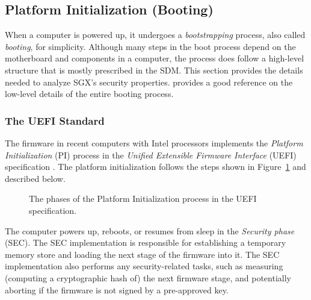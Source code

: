 \subsection{Platform Initialization (Booting)}
\label{sec:booting}

When a computer is powered up, it undergoes a \textit{bootstrapping} process,
also called \textit{booting}, for simplicity. Although many steps in the boot
process depend on the motherboard and components in a computer, the process
does follow a high-level structure that is mostly prescribed in the SDM. This
section provides the details needed to analyze SGX's security properties.
\cite{intel2010booting} provides a good reference on the low-level details of
the entire booting process.

\subsubsection{The UEFI Standard}
\label{sec:efi}

The firmware in recent computers with Intel processors implements the
\textit{Platform Initialization} (PI) process in the \textit{Unified
Extensible Firmware Interface} (UEFI) specification \cite{forum2015uefi}. The
platform initialization follows the steps shown in Figure~\ref{fig:uefi} and
described below.

\begin{figure}[hbt]
  \caption{
    The phases of the Platform Initialization process in the UEFI
    specification.
  }
  \label{fig:uefi}
\end{figure}

The computer powers up, reboots, or resumes from sleep in the
\textit{Security phase} (SEC). The SEC implementation is responsible for
establishing a temporary memory store and loading the next stage of the
firmware into it. The SEC implementation also performs any security-related
tasks, such as measuring (computing a cryptographic hash of) the next firmware
stage, and potentially aborting if the firmware is not signed by a pre-approved
key.

